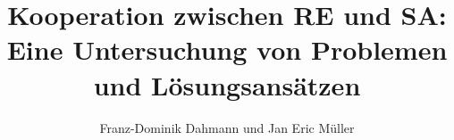 \documentclass[11pt]{beamer}
\author{Franz-Dominik Dahmann und Jan Eric M\"uller}
\title[Kooperation zwischen RE und SA]{Kooperation zwischen RE und SA: \\Eine Untersuchung von Problemen und L\"osungsans\"atzen}
\institute{Hochschule Bonn-Rhein-Sieg}
\begin{document}
\begin{frame}
\titlepage
\end{frame}

\begin{frame}
\tableofcontents
\end{frame}






\end{document}
